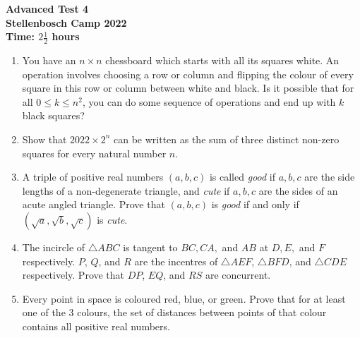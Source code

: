 \documentclass{article}
\begin{document}
\thispagestyle{empty}

\begin{center}
  \textbf{\Large Advanced Test 4}
  \\ \vspace{1em}
  \textbf{\large Stellenbosch Camp 2022}
  \\ \vspace{1em}
  \textbf{\large Time: $2\frac{1}{2}$ hours}
\end{center}

\bigskip

\begin{enumerate}[itemsep=\fill]

\item %
You have an $n\times n$ chessboard which starts with all its squares white. An operation involves choosing a row or column and flipping the colour of every square in this row or column between white and black. Is it possible that for all $0\leq k\leq n^2$, you can do some sequence of operations and end up with $k$ black squares?


\item %
Show that $2022 \times 2^n$ can be written as the sum of three distinct non-zero squares for every natural number $n$.


\item %
A triple of positive real numbers $(a,b,c)$ is called \textit{good} if $a,b,c$ are the side lengths of a non-degenerate triangle, and \textit{cute} if $a,b,c$ are the sides of an acute angled triangle. Prove that $(a,b,c)$ is \textit{good} if and only if $(\sqrt{a},\sqrt{b},\sqrt{c})$ is \textit{cute}. 


\item %
The incircle of $\triangle ABC$ is tangent to $BC,CA,$ and $AB$ at $D,E,$ and $F$ respectively.
$P$, $Q$, and $R$ are the incentres of $\triangle AEF$, $\triangle BFD$, and $\triangle CDE$ respectively.
Prove that $DP$, $EQ$, and $RS$ are concurrent.


\item %
Every point in space is coloured red, blue, or green. Prove that for at least one of the 3 colours, the set of distances between points of that colour contains all positive real numbers.


\end{enumerate}
\end{document}
